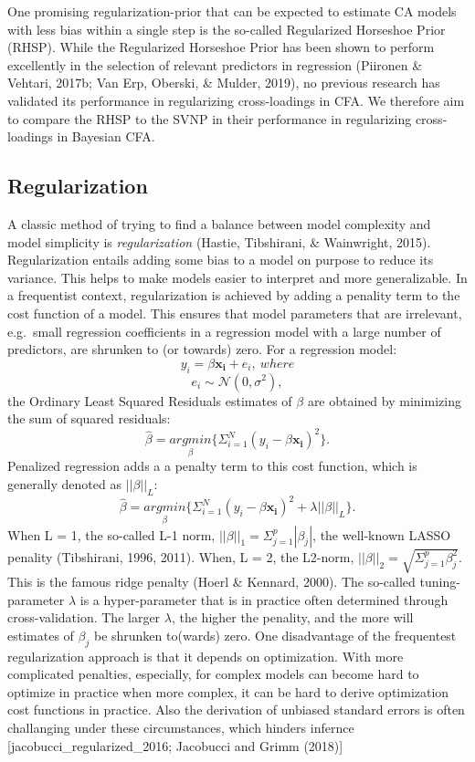\documentclass[
  man, donotrepeattitle,floatsintext]{apa6}
\begin{document}
One promising regularization-prior that can be expected to estimate CA models with less bias within a single step is the so-called Regularized Horseshoe Prior (RHSP). While the Regularized Horseshoe Prior has been shown to perform excellently in the selection of relevant predictors in regression (Piironen \& Vehtari, 2017b; Van Erp, Oberski, \& Mulder, 2019), no previous research has validated its performance in regularizing cross-loadings in CFA. We therefore aim to compare the RHSP to the SVNP in their performance in regularizing cross-loadings in Bayesian CFA.

\hypertarget{regularization}{%
\subsection{Regularization}\label{regularization}}

A classic method of trying to find a balance between model complexity and model simplicity is \emph{regularization} (Hastie, Tibshirani, \& Wainwright, 2015). Regularization entails adding some bias to a model on purpose to reduce its variance. This helps to make models easier to interpret and more generalizable. In a frequentist context, regularization is achieved by adding a penality term to the cost function of a model. This ensures that model parameters that are irrelevant, e.g.~small regression coefficients in a regression model with a large number of predictors, are shrunken to (or towards) zero. For a regression model:
\[y_i = \beta \mathbf{x_i} + e_i, \ where \]
\[e_i \sim \mathcal{N}(0, \sigma^2), \]
the Ordinary Least Squared Residuals estimates of \(\beta\) are obtained by minimizing the sum of squared residuals:
\[ \hat{\beta} = \underset{\beta}{argmin} \{ \Sigma_{i=1}^N(y_i - \beta\mathbf{x_{i}} )^2 \}.\] Penalized regression adds a a penalty term to this cost function, which is generally denoted as \(||\beta||_L\):
\[ \hat{\beta} = \underset{\beta}{argmin} \{ \Sigma_{i=1}^N(y_i - \beta \mathbf{x_{i}} )^2 + \lambda ||\beta||_{L} \}.\]
When L = 1, the so-called L-1 norm, \(||\beta||_1 = \Sigma_{j=1}^p |\beta_j|\), the well-known LASSO penality (Tibshirani, 1996, 2011). When, L = 2, the L2-norm, \(||\beta||_2 = \sqrt{\Sigma_{j=1}^p \beta_j^2}\). This is the famous ridge penalty (Hoerl \& Kennard, 2000). The so-called tuning-parameter \(\lambda\) is a hyper-parameter that is in practice often determined through cross-validation. The larger \(\lambda\), the higher the penality, and the more will estimates of \(\beta_j\) be shrunken to(wards) zero. One disadvantage of the frequentest regularization approach is that it depends on optimization. With more complicated penalties, especially, for complex models can become hard to optimize in practice when more complex, it can be hard to derive optimization cost functions in practice. Also the derivation of unbiased standard errors is often challanging under these circumstances, which hinders infernce {[}jacobucci\_regularized\_2016; Jacobucci and Grimm (2018){]}
\end{document}

